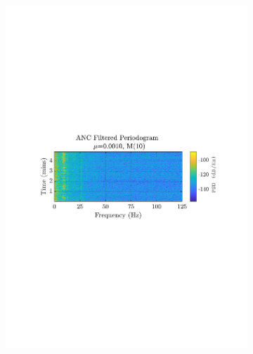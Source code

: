 \documentclass[12pt]{article}
\numberwithin{equation}{section}
\begin{document}
\begin{figure}[H]
\begin{subfigure}{0.49\textwidth}
					\includegraphics[trim={2.2cm 11.2cm 2.70cm  11.2cm}, clip, width=\textwidth]{../MATLAB/figures/q2_3d_fig03.pdf} 
					\captionsetup{justification=centering}
				\end{subfigure}
				

\end{figure}
\end{document}

